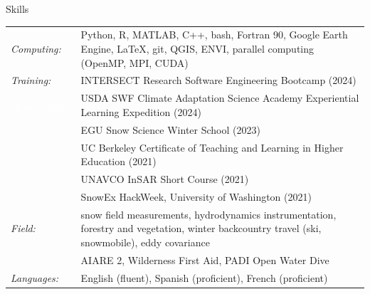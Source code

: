 \documentclass{cv}
\begin{document}
\begin{cSection}{Skills}
\renewcommand{\arraystretch}{1.2}
\vspace{1.6em}
\begin{tabularx}{.98\textwidth}{l X}
\textit{Computing:} & Python, R, MATLAB, C++, bash, Fortran 90, Google Earth Engine, \LaTeX, git, QGIS, ENVI,  parallel computing (OpenMP, MPI, CUDA) \\
\textit{Training: } & INTERSECT Research Software Engineering Bootcamp (2024) \\
 \textcolor{white}{Memberships:} & USDA SWF Climate Adaptation Science Academy Experiential Learning Expedition (2024) \\ 
& EGU Snow Science Winter School (2023) \\
&UC Berkeley Certificate of Teaching and Learning in Higher Education (2021) \\
& UNAVCO InSAR Short Course (2021) \\
& SnowEx HackWeek, University of Washington (2021) \\
 \textit{Field:} & snow field measurements, hydrodynamics instrumentation, forestry and vegetation, winter backcountry travel (ski, snowmobile), eddy covariance \\
 & AIARE 2, Wilderness First Aid, PADI Open Water Dive \\ 
 \textit{Languages:} & English (fluent), Spanish (proficient), French (proficient) \\
\end{tabularx}
\end{cSection}
\end{document}

